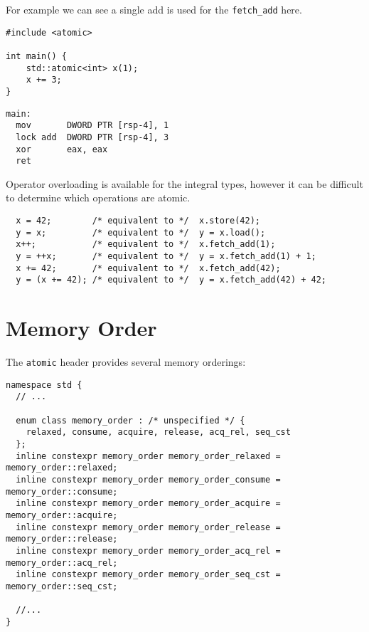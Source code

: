 For example we can see a single add is used for the \texttt{fetch_add} here.
\\ \begin{minipage}{.49\textwidth}
  \begin{verbatim}
#include <atomic>

int main() {
    std::atomic<int> x(1);
    x += 3;
}
  \end{verbatim}
\end{minipage}
\hfill
\begin{minipage}{.49\textwidth}
  \begin{verbatim}
main:
  mov       DWORD PTR [rsp-4], 1
  lock add  DWORD PTR [rsp-4], 3
  xor       eax, eax
  ret

  \end{verbatim}
\end{minipage}

Operator overloading is available for the integral types, however it can be difficult to determine which operations are atomic.
\begin{verbatim}
  x = 42;        /* equivalent to */  x.store(42);
  y = x;         /* equivalent to */  y = x.load();
  x++;           /* equivalent to */  x.fetch_add(1);
  y = ++x;       /* equivalent to */  y = x.fetch_add(1) + 1;
  x += 42;       /* equivalent to */  x.fetch_add(42);
  y = (x += 42); /* equivalent to */  y = x.fetch_add(42) + 42;
\end{verbatim}

\section{Memory Order}
The \texttt{atomic} header provides several memory orderings:
\begin{verbatim}
namespace std {
  // ...

  enum class memory_order : /* unspecified */ {
    relaxed, consume, acquire, release, acq_rel, seq_cst
  };
  inline constexpr memory_order memory_order_relaxed = memory_order::relaxed;
  inline constexpr memory_order memory_order_consume = memory_order::consume;
  inline constexpr memory_order memory_order_acquire = memory_order::acquire;
  inline constexpr memory_order memory_order_release = memory_order::release;
  inline constexpr memory_order memory_order_acq_rel = memory_order::acq_rel;
  inline constexpr memory_order memory_order_seq_cst = memory_order::seq_cst;

  //...
}
\end{verbatim}


